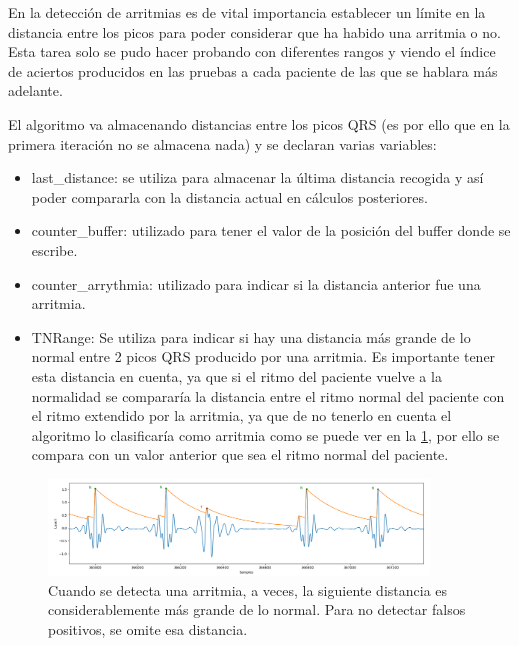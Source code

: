 En la detección de arritmias es de vital importancia establecer un límite en la distancia entre los picos
para poder considerar que ha habido una arritmia o no. Esta tarea solo se pudo hacer probando con diferentes
rangos y viendo el índice de aciertos producidos en las pruebas a cada paciente de las que se hablara más adelante. 

El algoritmo va almacenando distancias entre los picos QRS (es por ello que en la primera iteración no se almacena nada)
y se declaran varias variables:

\begin{itemize}
    \item last\_distance: se utiliza para almacenar la última distancia recogida y así poder compararla con la distancia 
    actual en cálculos posteriores.
    \item counter\_buffer: utilizado para tener el valor de la posición del buffer donde se escribe.
    \item counter\_arrythmia: utilizado para indicar si la distancia anterior fue una arritmia.
    \item TNRange: Se utiliza para indicar si hay una distancia más grande de lo normal entre 2 picos QRS producido
    por una arritmia. Es importante tener esta distancia en cuenta, ya que si el ritmo del paciente vuelve a la
    normalidad se compararía la distancia entre el ritmo normal del paciente con el ritmo extendido por la arritmia,
    ya que de no tenerlo en cuenta el algoritmo lo clasificaría como arritmia como se puede ver en la \cref{fig:senial_explicacion_TNRANGE}, por ello se compara con un valor anterior
    que sea el ritmo normal del paciente.
\end{itemize}

\begin{figure}[h!]
    \centering
    \includegraphics[width=0.9\textwidth]{./Images/img_algoritmo/senial_explicacion_TNRANGE.png}
    \caption{Cuando se detecta una arritmia, a veces, la siguiente distancia es considerablemente más grande de lo normal. Para no detectar falsos positivos, se omite esa distancia.}
    \label{fig:senial_explicacion_TNRANGE}
\end{figure}

